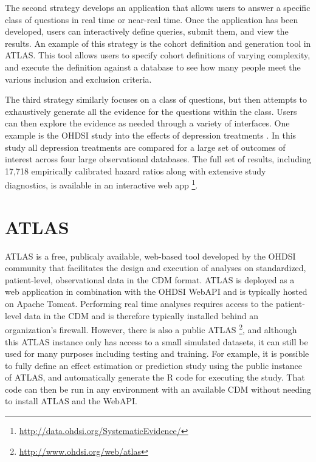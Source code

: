 \documentclass[11pt]{book}
\let\rmarkdownfootnote\footnote%
\def\footnote{\protect\rmarkdownfootnote}
\theoremstyle{definition}
\theoremstyle{definition}
\theoremstyle{definition}
\theoremstyle{remark}
\begin{document}
The second strategy develops an application that allows users to answer a specific class of questions in real time or near-real time. Once the application has been developed, users can interactively define queries, submit them, and view the results. An example of this strategy is the cohort definition and generation tool in ATLAS. This tool allows users to specify cohort definitions of varying complexity, and execute the definition against a database to see how many people meet the various inclusion and exclusion criteria.

The third strategy similarly focuses on a class of questions, but then attempts to exhaustively generate all the evidence for the questions within the class. Users can then explore the evidence as needed through a variety of interfaces. One example is the OHDSI study into the effects of depression treatments \citep{schuemie_2018b}. In this study all depression treatments are compared for a large set of outcomes of interest across four large observational databases. The full set of results, including 17,718 empirically calibrated hazard ratios along with extensive study diagnostics, is available in an interactive web app \footnote{\url{http://data.ohdsi.org/SystematicEvidence/}}.

\hypertarget{atlas}{%
\section{ATLAS}\label{atlas}}

ATLAS is a free, publicaly available, web-based tool developed by the OHDSI community that facilitates the design and execution of analyses on standardized, patient-level, observational data in the CDM format. ATLAS is deployed as a web application in combination with the OHDSI WebAPI and is typically hosted on Apache Tomcat. Performing real time analyses requires access to the patient-level data in the CDM and is therefore typically installed behind an organization's firewall. However, there is also a public ATLAS \footnote{\url{http://www.ohdsi.org/web/atlas}}, and although this ATLAS instance only has access to a small simulated datasets, it can still be used for many purposes including testing and training. For example, it is possible to fully define an effect estimation or prediction study using the public instance of ATLAS, and automatically generate the R code for executing the study. That code can then be run in any environment with an available CDM without needing to install ATLAS and the WebAPI. 
\end{document}
